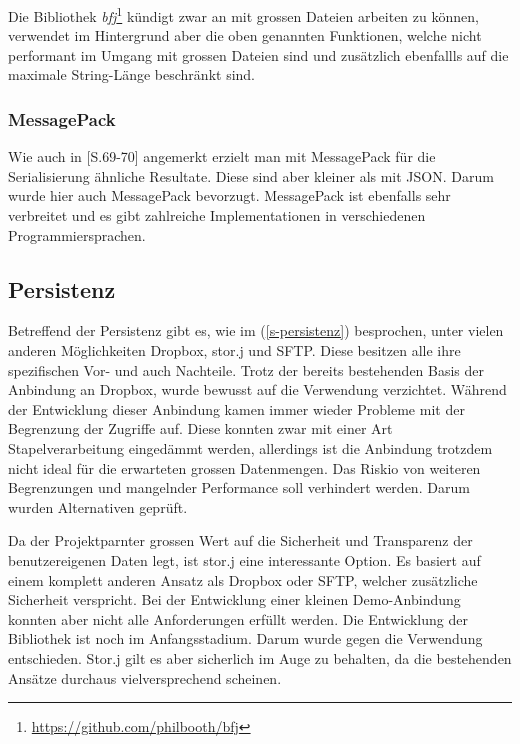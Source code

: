 Die Bibliothek \textit{bfj}\footnote{\url{https://github.com/philbooth/bfj}} kündigt zwar an mit grossen Dateien arbeiten zu können, verwendet im Hintergrund aber die oben genannten Funktionen, welche nicht performant im Umgang mit grossen Dateien sind und zu\-sätz\-lich ebenfallls auf die maximale String-Länge beschränkt sind.


\subsubsection{MessagePack}


Wie auch in \cite{msgpack-conf}[S.69-70] angemerkt erzielt man mit MessagePack für die Serialisierung ähnliche Resultate. Diese sind aber kleiner als mit JSON. Darum wurde hier auch MessagePack bevorzugt. MessagePack ist ebenfalls sehr verbreitet und es gibt zahlreiche Implementationen in verschiedenen Programmiersprachen.


\subsection{Persistenz}


Betreffend der Persistenz gibt es, wie im (\autoref{s-persistenz}) besprochen, unter vielen anderen Möglichkeiten Dropbox, stor.j und SFTP. Diese besitzen alle ihre spezifischen Vor- und auch Nachteile. Trotz der bereits bestehenden Basis der Anbindung an Dropbox, wurde bewusst auf die Verwendung verzichtet. Während der Entwicklung dieser Anbindung kamen immer wieder Probleme mit der Begrenzung der Zugriffe auf. Diese konnten zwar mit einer Art Stapelverarbeitung eingedämmt werden, allerdings ist die Anbindung trotzdem nicht ideal für die erwarteten grossen Datenmengen. Das Riskio von weiteren Begrenzungen und mangelnder Performance soll verhindert werden. Darum wurden Alternativen geprüft. 

Da der Projektparnter grossen Wert auf die Sicherheit und Transparenz der benutzereigenen Daten legt, ist stor.j eine interessante Option. Es basiert auf einem komplett anderen Ansatz als Dropbox oder SFTP, welcher zusätzliche Sicherheit verspricht. Bei der Entwicklung einer kleinen Demo-Anbindung konnten aber nicht alle Anforderungen erfüllt werden. Die Entwicklung der Bibliothek ist noch im Anfangsstadium. Darum wurde gegen die Verwendung entschieden. Stor.j gilt es aber sicherlich im Auge zu behalten, da die bestehenden Ansätze durchaus vielversprechend scheinen.

